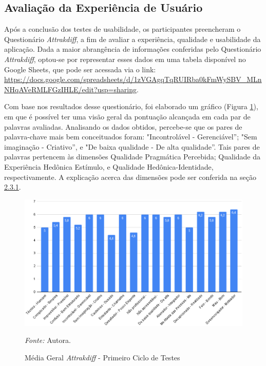 \subsection{Avaliação da Experiência de Usuário}
\label{sec:Avaliação da Experiência de Usuário}
Após a conclusão dos testes de usabilidade, os participantes preencheram o Questionário \textit{Attrakdiff}, a fim de 
avaliar a experiência, qualidade e usabilidade da aplicação. Dada a maior abrangência de informações conferidas pelo Questionário \textit{Attrakdiff}, optou-se por representar esses dados em uma tabela disponível no Google Sheets, que pode ser acessada via o link: 
\url{https://docs.google.com/spreadsheets/d/1zVGAgqTqRUIRba0kFmWySBV_MLnNHqAVeRMLFGzIHLE/edit?usp=sharing}. 

Com base nos resultados desse questionário, foi elaborado um gráfico (Figura \ref{fig20}), em que é possível ter uma visão geral da pontuação alcançada em cada par de palavras avaliadas. Analisando os dados obtidos, percebe-se que os pares de palavra-chave mais bem conceituados foram: "Incontrolável - Gerenciável''; "Sem imaginação - Criativo'', e "De baixa qualidade - De alta qualidade''. 
Tais pares de palavras pertencem às dimensões Qualidade Pragmática Percebida; Qualidade da Experiência Hedônica Estímulo, e Qualidade Hedônica-Identidade, respectivamente. A explicação acerca das dimensões 
pode ser conferida na seção \hyperref[sec:Medicao2]{2.3.1}. 

\begin{figure}[h!]
	\centering
	\caption{Média Geral \textit{Attrakdiff} - Primeiro Ciclo de Testes}
	\begin{adjustbox}{center}
		\includegraphics[width=1\textwidth]{figuras/media-geral.eps}
	\end{adjustbox}
	\begin{tablenotes}[flushleft]
		\centering
		\item \textit{Fonte:} Autora.
	\end{tablenotes}
	\label{fig20}
\end{figure}


